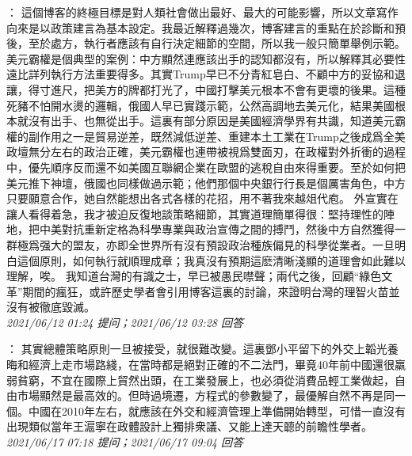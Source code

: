 \documentclass[twocolumn]{ctexart}
\begin{document}
：
這個博客的終極目標是對人類社會做出最好、最大的可能影響，所以文章寫作向來是以政策建言為基本設定。我最近解釋過幾次，博客建言的重點在於診斷和預後，至於處方，執行者應該有自行決定細節的空間，所以我一般只簡單舉例示範。
美元霸權是個典型的案例：中方顯然連應該出手的認知都沒有，所以解釋其必要性遠比詳列執行方法重要得多。其實Trump早已不分青紅皂白、不顧中方的妥協和退讓，得寸進尺，把美方的牌都打光了，中國打擊美元根本不會有更壞的後果。這種死豬不怕開水燙的邏輯，俄國人早已實踐示範，公然高調地去美元化，結果美國根本就沒有出手、也無從出手。這裏有部分原因是美國經濟學界有共識，知道美元霸權的副作用之一是貿易逆差，既然減低逆差、重建本土工業在Trump之後成爲全美政壇無分左右的政治正確，美元霸權也連帶被視爲雙面刃，在政權對外折衝的過程中，優先順序反而還不如美國互聯網企業在歐盟的逃稅自由來得重要。至於如何把美元推下神壇，俄國也同樣做過示範；他們那個中央銀行行長是個厲害角色，中方只要願意合作，她自然能想出各式各樣的花招，用不著我來越俎代庖。
外宣實在讓人看得着急，我才被迫反復地談策略細節，其實道理簡單得很：堅持理性的陣地，把中美對抗重新定格為科學專業與政治宣傳之間的搏鬥，然後中方自然獲得一群極爲强大的盟友，亦即全世界所有沒有預設政治種族偏見的科學從業者。一旦明白這個原則，如何執行就順理成章；我真沒有預期這麽清晰淺顯的道理會如此難以理解，唉。
我知道台灣的有識之士，早已被愚民噤聲；兩代之後，回顧“綠色文革”期間的瘋狂，或許歷史學者會引用博客這裏的討論，來證明台灣的理智火苗並沒有被徹底毀滅。
\\

\textit{\hfill\noindent\small 2021/06/12 01:24 提问；2021/06/12 03:28 回答}

：
其實總體策略原則一旦被接受，就很難改變。這裏鄧小平留下的外交上韜光養晦和經濟上走市場路綫，在當時都是絕對正確的不二法門，畢竟40年前中國還很羸弱貧窮，不宜在國際上貿然出頭，在工業發展上，也必須從消費品輕工業做起，自由市場顯然是最高效的。但時過境遷，方程式的參數變了，最優解自然不再是同一個。中國在2010年左右，就應該在外交和經濟管理上準備開始轉型，可惜一直沒有出現類似當年王滬寧在政體設計上獨排衆議、又能上達天聼的前瞻性學者。
\\

\textit{\hfill\noindent\small 2021/06/17 07:18 提问；2021/06/17 09:04 回答}
\end{document}
